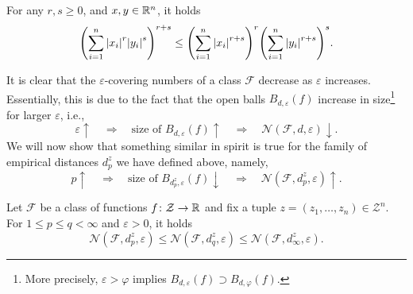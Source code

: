 \begin{proposition}[H{\"o}lder, 1889]
\label{prop: hoelder}
For any $r, s \geq 0$, and $x, y \in \mathbb{R}^n$, it holds
\[
    \left(\sum_{i=1}^n \abs{x_i}^r \abs{y_i}^s \right)^{r+s} \leq \left(\sum_{i=1}^n \abs{x_i}^{r+s}\right)^r \left(\sum_{i=1}^n \abs{y_i}^{r+s}\right)^s.
\]
\end{proposition}

It is clear that the $\varepsilon$-covering numbers of a class $\mathcal{F}$ decrease as $\varepsilon$ increases. Essentially, this is due to the fact that the open balls $B_{d, \varepsilon}(f)$ increase in size\footnote{More precisely, $\varepsilon > \varphi$ implies $B_{d, \varepsilon}(f) \supset B_{d, \varphi}(f)$.} for larger $\varepsilon$, i.e.,
\[
    \varepsilon \uparrow \quad \Rightarrow \quad \text{size of } B_{d, \varepsilon}(f) \uparrow \quad \Rightarrow \quad \mathcal{N}(\mathcal{F}, d, \varepsilon) \downarrow.
\]
We will now show that something similar in spirit is true for the family of empirical distances $d_p^z$ we have defined above, namely,
\[
    p \uparrow \quad \Rightarrow \quad \text{size of } B_{d_p^z, \varepsilon}(f) \downarrow \quad \Rightarrow \quad \mathcal{N}(\mathcal{F}, d_p^z, \varepsilon) \uparrow.
\]

\begin{proposition}
Let $\mathcal{F}$ be a class of functions $f \colon \mathcal{Z} \to \mathbb{R}$ and fix a tuple $z = (z_1, \dots, z_n) \in \mathcal{Z}^n$. For $1 \leq p \leq q < \infty$ and $\varepsilon > 0$, it holds
\[
    \mathcal{N}(\mathcal{F}, d_p^z, \varepsilon) \leq \mathcal{N}(\mathcal{F}, d_q^z, \varepsilon) \leq \mathcal{N}(\mathcal{F}, d_{\infty}^z, \varepsilon).
\]
\end{proposition}

